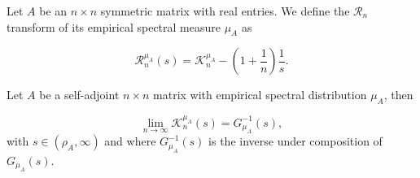 \begin{definition}
    Let $A$ be an $n\times n$ symmetric matrix with real entries. We define the $\mathcal R_n$ transform of its empirical spectral measure $\mu_A$ as 

    \begin{equation*}
        \mathcal R_n^{\mu_A} (s) = \mathcal K_n^{\mu_A} - \left( 1 + \frac1n \right) \frac1s.
    \end{equation*}
\end{definition}

\begin{theorem} Let $A$ be a self-adjoint $n \times n$ matrix with empirical spectral distribution $\mu_A$, then

    \begin{equation*}
        \lim_{n\to\infty} \mathcal K_n^{\mu_A} (s) = G_{\mu_A}^{-1}(s),
    \end{equation*}
\noindent with $s \in (\rho_A, \infty)$ and where $G_{\mu_A}^{-1}(s)$ is the inverse under composition of $G_{\mu_A}(s)$.
\end{theorem}

